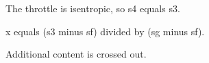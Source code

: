The throttle is isentropic, so s4 equals s3.  

x equals (s3 minus sf) divided by (sg minus sf).  

Additional content is crossed out.